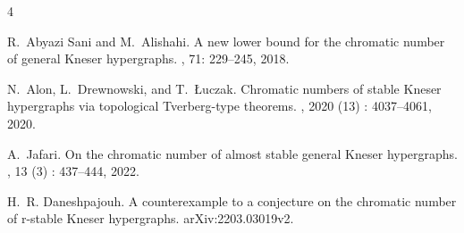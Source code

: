 \documentclass[11pt]{article}
\begin{document}
%
%
\def\cprime{$'$} \def\cprime{$'$}
\begin{thebibliography}{4}

R.~Abyazi Sani and M.~Alishahi.
\newblock A new lower bound for the chromatic number of general Kneser hypergraphs.
, 71: 229--245, 2018.

N.~Alon, L.~Drewnowski, and T.~{\L}uczak.
\newblock Chromatic numbers of stable Kneser hypergraphs via topological Tverberg-type theorems.
, 2020 (13) : 4037--4061, 2020.

A.~Jafari.
\newblock On the chromatic number of almost stable general
Kneser hypergraphs.
, 13 (3) : 437--444, 2022.

H.~R. Daneshpajouh.
\newblock A counterexample to a conjecture on the chromatic number of r-stable Kneser hypergraphs.
\newblock arXiv:2203.03019v2.

\end{thebibliography}

\end{document}
